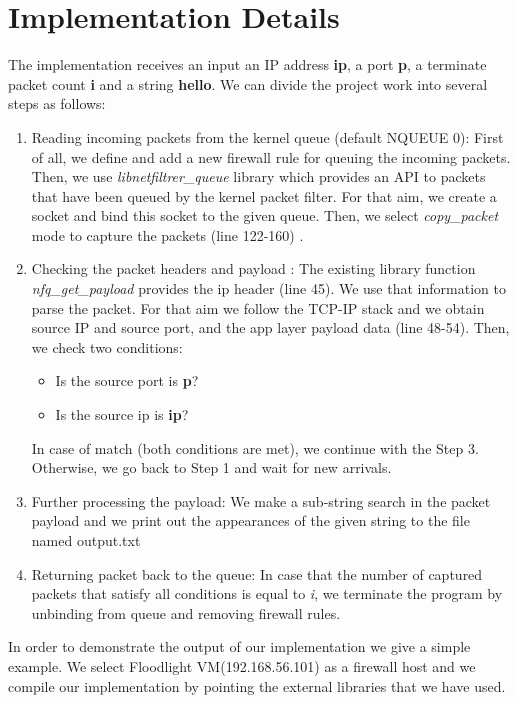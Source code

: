 \documentclass[paper=a4, fontsize=11pt]{scrartcl}
\numberwithin{equation}{section}		%
\numberwithin{figure}{section}			%
\numberwithin{table}{section}				%
\begin{document}
\section{Implementation Details}
The implementation receives an input an IP address \textbf{ip}, a port \textbf{p}, a terminate packet count \textbf{i} and a string \textbf{hello}. We can divide the project work into several steps as follows:
\begin{enumerate}
    \item Reading incoming packets from the kernel queue (default NQUEUE 0): First of all, we define and add a new firewall rule for queuing the incoming packets. Then, we use \textit{libnetfiltrer\_queue} library which provides an API to packets that have been queued by the kernel packet filter. For that aim, we create a socket and bind this socket to the given queue. Then, we select \textit{copy\_packet} mode to capture the packets (line 122-160) \cite{r1}.
    \item Checking the packet headers and payload :
   The existing library function \textit{nfq\_get\_payload} provides the ip header (line 45). We use that information to parse the packet. For that aim we follow the TCP-IP stack and we obtain source IP and source port, and the app layer payload data (line 48-54). Then, we check two conditions:
   \begin{itemize}
       \item Is the source port is \textbf{p}?
       \item Is the source ip is \textbf{ip}?
   \end{itemize}
   
   In case of match (both conditions are met), we continue with the Step 3. Otherwise, we go back to Step 1 and wait for new arrivals.
    \item Further processing the payload:
    We make a sub-string search in the packet payload and we print out the appearances of the given string to the file named output.txt
    \item Returning packet back to the queue:
    In case that the number of captured packets that satisfy all conditions is equal to \textit{i}, we terminate the program by unbinding from queue and removing firewall rules.
\end{enumerate}

In order to demonstrate the output of our implementation we give a simple example. We select Floodlight VM(192.168.56.101) as a firewall host and we compile our implementation by pointing the external libraries that we have used. \\
\end{document}

